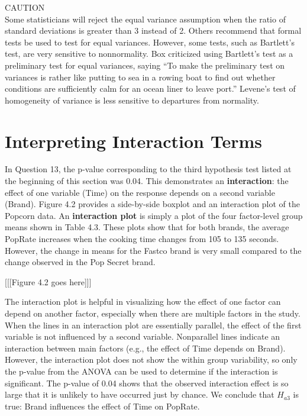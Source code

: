 \documentclass[
]{report}
\theoremstyle{definition}
\theoremstyle{definition}
\theoremstyle{definition}
\theoremstyle{definition}
\theoremstyle{remark}
\begin{document}
CAUTION\\
Some statisticians will reject the equal variance assumption when the ratio of standard deviations is
greater than 3 instead of 2. Others recommend that formal tests be used to test for equal variances.
However, some tests, such as Bartlett's test, are very sensitive to nonnormality. Box criticized using
Bartlett's test as a preliminary test for equal variances, saying ``To make the preliminary test on variances
is rather like putting to sea in a rowing boat to find out whether conditions are sufficiently calm
for an ocean liner to leave port.'' Levene's test of homogeneity of variance is less sensitive to departures
from normality.

\hypertarget{interpreting-interaction-terms}{%
\section{Interpreting Interaction Terms}\label{interpreting-interaction-terms}}

In Question 13, the p-value corresponding to the third hypothesis test listed at the beginning of this section
was 0.04. This demonstrates an \textbf{interaction}: the effect of one variable (Time) on the response depends on a
second variable (Brand). Figure 4.2 provides a side-by-side boxplot and an interaction plot of the Popcorn
data. An \textbf{interaction plot} is simply a plot of the four factor-level group means shown in Table 4.3. These plots
show that for both brands, the average PopRate increases when the cooking time changes from 105 to 135
seconds. However, the change in means for the Fastco brand is very small compared to the change observed
in the Pop Secret brand.

{[}{[}{[}Figure 4.2 goes here{]}{]}{]}

The interaction plot is helpful in visualizing how the effect of one factor can depend on another factor,
especially when there are multiple factors in the study. When the lines in an interaction plot are essentially
parallel, the effect of the first variable is not influenced by a second variable. Nonparallel lines indicate an
interaction between main factors (e.g., the effect of Time depends on Brand). However, the interaction plot
does not show the within group variability, so only the p-value from the ANOVA can be used to determine
if the interaction is significant. The p-value of 0.04 shows that the observed interaction effect is so large that
it is unlikely to have occurred just by chance. We conclude that \(H_{a3}\) is true: Brand influences the effect of
Time on PopRate.
\end{document}
